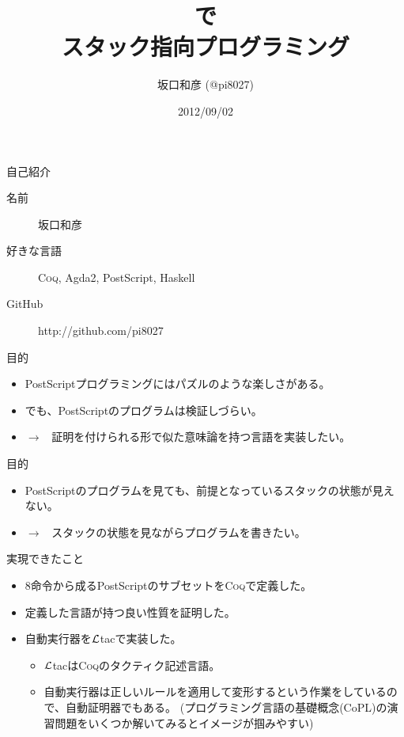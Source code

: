 \documentclass[cjk, 14pt]{beamer}
\title{\Coq{}で\\スタック指向プログラミング}
\author{坂口和彦 (@pi8027)}
\institute{筑波大学 情報学群 情報科学類 B2}
\date{2012/09/02}
\newcommand{\Coq}{{\scshape{}Coq}}
\newcommand{\Ltac}{\mbox{\emph{$\cal L$}tac}}
\begin{document}
\begin{frame}[plain]

 \maketitle

\end{frame}

\begin{frame}{自己紹介}

  \begin{description}
    \item [名前] 坂口和彦
    \item [好きな言語] \Coq, Agda2, PostScript, Haskell
    \item [GitHub] http://github.com/pi8027
  \end{description}

\end{frame}

\begin{frame}{目的}

  \begin{itemize}
    \item PostScriptプログラミングにはパズルのような楽しさがある。
    \item でも、PostScriptのプログラムは検証しづらい。
    \item $\rightarrow$ \, 証明を付けられる形で似た意味論を持つ言語を実装したい。
  \end{itemize}

\end{frame}

\begin{frame}{目的}

  \begin{itemize}
    \item PostScriptのプログラムを見ても、前提となっているスタックの状態が見えない。
    \item $\rightarrow$ \, スタックの状態を見ながらプログラムを書きたい。
  \end{itemize}

\end{frame}

\begin{frame}{実現できたこと}

  \begin{itemize}
    \item 8命令から成るPostScriptのサブセットを\Coq{}で定義した。
    \item 定義した言語が持つ良い性質を証明した。
    \item 自動実行器を\Ltac{}で実装した。
    \begin{itemize}
      \item \Ltac{}は\Coq{}のタクティク記述言語。
      \item 自動実行器は正しいルールを適用して変形するという作業をしているので、自動証明器でもある。
        (プログラミング言語の基礎概念(CoPL)の演習問題をいくつか解いてみるとイメージが掴みやすい)
    \end{itemize}
  \end{itemize}

\end{frame}
\end{document}
